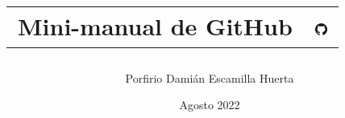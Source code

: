 

\title{
	\begin{tabular}{cc}
		Mini-manual de GitHub & 
		\includegraphics[width=15px]{GitHub-Mark-120px-plus.png}
	\end{tabular}
}
\author{Porfirio Damián Escamilla Huerta}
\date{Agosto 2022}

\lstset{style=bashStyle}


	
	\maketitle
	\newpage
	
	
	
	
	
	
	
	
	

